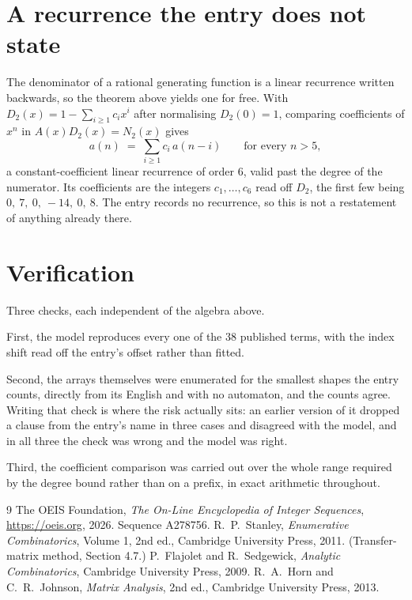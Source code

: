 \documentclass[11pt,a4paper]{article}
\theoremstyle{plain}
\theoremstyle{definition}
\begin{document}
\section{A recurrence the entry does not state}

The denominator of a rational generating function is a linear recurrence written backwards, so
the theorem above yields one for free. With $D_2(x)=1-\sum_{i\ge1}c_ix^i$ after normalising
$D_2(0)=1$, comparing coefficients of $x^n$ in $A(x)D_2(x)=N_2(x)$ gives
\[
a(n)\;=\;\sum_{i\ge1}c_i\,a(n-i)\qquad\text{for every }n>5,
\]
a constant-coefficient linear recurrence of order $6$, valid past the degree of the
numerator. Its coefficients are the integers $c_1,\dots,c_{6}$ read off $D_2$, the first few being $0,\ 7,\ 0,\ -14,\ 0,\ 8$. The entry records no recurrence, so this is not a restatement of anything
already there.

\section{Verification}

Three checks, each independent of the algebra above.

First, the model reproduces every one of the $38$ published terms, with the index shift
read off the entry's offset rather than fitted.

Second, the arrays themselves were enumerated for the smallest shapes the entry counts,
directly from its English and with no automaton, and the counts agree. Writing that check is
where the risk actually sits: an earlier version of it dropped a clause from the entry's name
in three cases and disagreed with the model, and in all three the check was wrong and the model
was right.

Third, the coefficient comparison was carried out over the whole range required by the degree
bound rather than on a prefix, in exact arithmetic throughout.

\begin{thebibliography}{9}
 The OEIS Foundation, \emph{The On-Line Encyclopedia of Integer
Sequences}, \url{https://oeis.org}, 2026. Sequence A278756.
 R.~P.~Stanley, \emph{Enumerative Combinatorics}, Volume 1, 2nd ed.,
Cambridge University Press, 2011. (Transfer-matrix method, Section 4.7.)
 P.~Flajolet and R.~Sedgewick, \emph{Analytic Combinatorics}, Cambridge
University Press, 2009.
 R.~A.~Horn and C.~R.~Johnson, \emph{Matrix Analysis}, 2nd ed., Cambridge
University Press, 2013.
\end{thebibliography}
\end{document}
